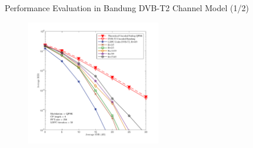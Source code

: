 \documentclass[11pt, aspectratio=169]{beamer}
\begin{document}

\begin{frame}{Performance Evaluation in Bandung DVB-T2 Channel Model (1/2)}
			\vspace{-0.2cm}
	\begin{figure}
		\centering
		\vspace{-0.25cm}
		\begin{minipage}{.5\linewidth}
			\hspace{1cm}
			\includegraphics[width=2.3in]{hasilOFDMdsfix.pdf}
			\vspace{-0.5cm}
			

\end{minipage}
\end{figure}
\end{frame}
\end{document}

